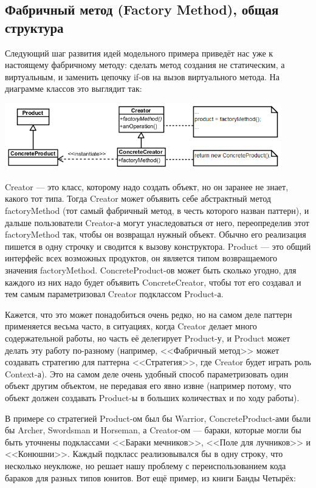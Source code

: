 \documentclass{../../text-style}
\begin{document}
\subsection{Фабричный метод (Factory Method), общая структура}

Следующий шаг развития идей модельного примера приведёт нас уже к настоящему фабричному методу: сделать метод создания не статическим, а виртуальным, и заменить цепочку if-ов на вызов виртуального метода. На диаграмме классов это выглядит так:

\begin{center}
    \includegraphics[width=0.9\textwidth]{factoryMethod.png}
\end{center}

Creator --- это класс, которому надо создать объект, но он заранее не знает, какого тот типа. Тогда Creator может объявить себе абстрактный метод factoryMethod (тот самый фабричный метод, в честь которого назван паттерн), и дальше пользователи Creator-а могут унаследоваться от него, переопределив этот factoryMethod так, чтобы он возвращал нужный объект. Обычно его реализация пишется в одну строчку и сводится к вызову конструктора. Product --- это общий интерфейс всех возможных продуктов, он является типом возвращаемого значения factoryMethod. ConcreteProduct-ов может быть сколько угодно, для каждого из них надо будет объявить ConcreteCreator, чтобы тот его создавал и тем самым параметризовал Creator подклассом Product-а.

Кажется, что это может понадобиться очень редко, но на самом деле паттерн применяется весьма  часто, в ситуациях, когда Creator делает много содержательной работы, но часть её делегирует Product-у, и Product может делать эту работу по-разному (например, <<Фабричный метод>> может создавать стратегию для паттерна <<Стратегия>>, где Creator будет играть роль Context-а). Это на самом деле очень удобный способ параметризовать один объект другим объектом, не передавая его явно извне (например потому, что объект должен создавать Product-ы в больших количествах и по ходу работы).

В примере со стратегией Product-ом был бы Warrior, ConcreteProduct-ами были бы Archer, Swordsman и Horseman, а Creator-ом --- бараки, которые могли бы быть уточнены подклассами <<Бараки мечников>>, <<Поле для лучников>> и <<Конюшни>>. Каждый подкласс реализовывался бы в одну строку, что несколько неуклюже, но решает нашу проблему с переиспользованием кода бараков для разных типов юнитов. Вот ещё пример, из книги Банды Четырёх:
\end{document}
